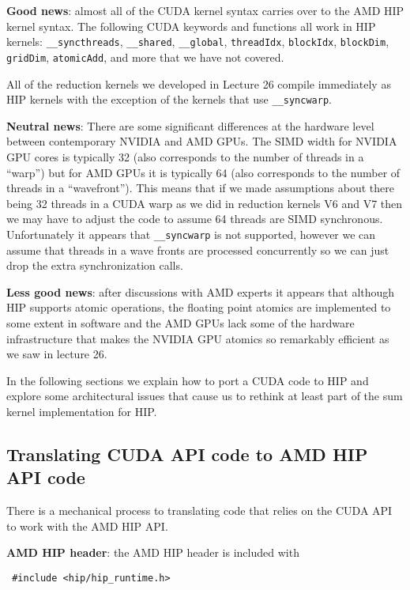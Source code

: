 {\bf Good news}: almost all of the CUDA kernel syntax carries over to the AMD HIP kernel syntax. The following CUDA keywords and functions all work in HIP kernels: \texttt{\_\_syncthreads}, \texttt{\_\_shared}, \texttt{\_\_global}, \texttt{threadIdx}, \texttt{blockIdx}, \texttt{blockDim}, \texttt{gridDim}, \texttt{atomicAdd}, and more that we have not covered. 

All of the reduction kernels we developed in Lecture 26 compile immediately as HIP kernels with the exception of the kernels that use \texttt{\_\_syncwarp}. 

{\bf Neutral news}: There are some significant differences at the hardware level between contemporary NVIDIA and AMD GPUs. The SIMD width for NVIDIA GPU cores is typically 32 (also corresponds to the number of threads in a ``warp'') but for AMD GPUs it is typically 64 (also corresponds to the number of threads in a ``wavefront'').  This means that if we made assumptions about there being 32 threads in a CUDA warp as we did in reduction kernels V6 and V7 then we may have to adjust the code to assume 64 threads are SIMD synchronous. Unfortunately it appears that \texttt{\_\_syncwarp} is not supported, however we can assume that threads in a wave fronts are processed concurrently so we can just drop the extra synchronization calls.

{\bf Less good news}: after discussions with AMD experts it appears that although HIP supports atomic operations, the floating point atomics are implemented to some extent in software and the AMD GPUs lack some of the hardware infrastructure that makes the NVIDIA GPU atomics so remarkably efficient as we saw in lecture 26. 

In the following sections we explain how to port a CUDA code to HIP and explore some architectural issues that cause us to rethink at least part of the sum kernel implementation for HIP.

\subsection{Translating CUDA API code to AMD HIP API code}

There is a mechanical process to translating code that relies on the CUDA API to work with the AMD HIP API. 

{\bf AMD HIP header}: the AMD HIP header is included with 

\begin{verbatim}
 #include <hip/hip_runtime.h>
\end{verbatim}

